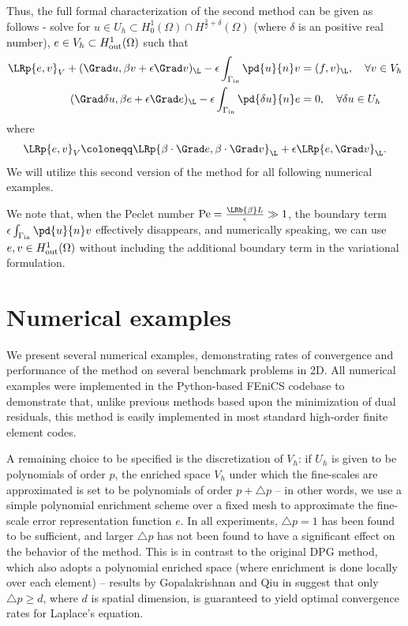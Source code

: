 Thus, the full formal characterization of the second method can be given as follows - solve for $u\in U_h \subset H^1_0(\Omega)\cap H^{\frac{3}{2}+\delta}(\Omega)$ (where $\delta$ is an positive real number), $e\in V_h\subset H^1_{\rm out}(\Omega)$ such that
\begin{align*}
\LRp{e,v}_V + (\Grad u, \beta v + \epsilon \Grad v)_{\L} - \epsilon\int_{\Gamma_{\rm in}} \pd{u}{n}v &= (f,v)_{\L}, \quad \forall v \in V_h\\
(\Grad \delta u, \beta e + \epsilon \Grad e)_{\L} - \epsilon\int_{\Gamma_{\rm in}} \pd{\delta u}{n}e &= 0, \quad \forall \delta u \in U_h
\end{align*}
where
\begin{align*}
\LRp{e,v}_V \coloneqq \LRp{\beta\cdot \Grad e,\beta\cdot \Grad v}_{\L} + \epsilon \LRp{e,\Grad v}_{\L}.
\end{align*}
We will utilize this second version of the method for all following numerical examples.  


\begin{remark}
We note that, when the Peclet number ${\rm Pe} = \frac{\LRb{\beta} L}{\epsilon} \gg 1$, the boundary term $\epsilon\int_{\Gamma_{\rm in}} \pd{u}{n}v$ effectively disappears, and numerically speaking, we can use $e,v\in H^1_{\rm out}(\Omega)$ without including the additional boundary term in the variational formulation.  
\end{remark}

\section{Numerical examples}

We present several numerical examples, demonstrating rates of convergence and performance of the method on several benchmark problems in 2D.  All numerical examples were implemented in the Python-based FEniCS codebase \cite{LoggMardalEtAl2012a} to demonstrate that, unlike previous methods based upon the minimization of dual residuals, this method is easily implemented in most standard high-order finite element codes.  

A remaining choice to be specified is the discretization of $V_h$: if $U_h$ is given to be polynomials of order $p$, the enriched space $V_h$ under which the fine-scales are approximated is set to be polynomials of order $p+\triangle p$ -- in other words, we use a simple polynomial enrichment scheme over a fixed mesh to approximate the fine-scale error representation function $e$.  In all experiments, $\triangle p = 1$ has been found to be sufficient, and larger $\triangle p$ has not been found to have a significant effect on the behavior of the method.  This is in contrast to the original DPG method, which also adopts a polynomial enriched space (where enrichment is done locally over each element) -- results by Gopalakrishnan and Qiu in \cite{practicalDPG} suggest that only $\triangle p \geq d$, where $d$ is spatial dimension, is guaranteed to yield optimal convergence rates for Laplace's equation.  

